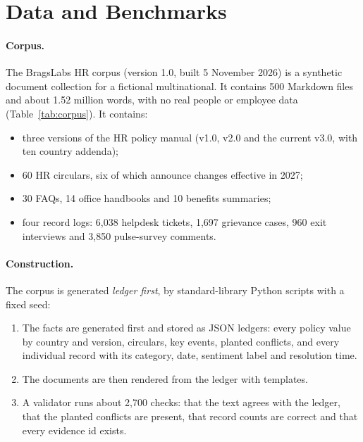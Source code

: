 \documentclass[11pt,letterpaper,oneside]{report}
\begin{document}
\section{Data and Benchmarks}
\label{sec:data}

\paragraph{Corpus.}
The BragsLabs HR corpus (version 1.0, built 5 November 2026) is a synthetic
document collection for a fictional multinational. It contains 500 Markdown
files and about 1.52 million words, with no real people or employee data
(Table~\ref{tab:corpus}). It contains:
\begin{itemize}
  \item three versions of the HR policy manual (v1.0, v2.0 and the current
  v3.0, with ten country addenda);
  \item 60 HR circulars, six of which announce changes effective in 2027;
  \item 30 FAQs, 14 office handbooks and 10 benefits summaries;
  \item four record logs: 6{,}038 helpdesk tickets, 1{,}697 grievance cases,
  960 exit interviews and 3{,}850 pulse-survey comments.
\end{itemize}

\paragraph{Construction.}
The corpus is generated \emph{ledger first}, by standard-library Python
scripts with a fixed seed:
\begin{enumerate}
  \item The facts are generated first and stored as JSON ledgers: every
  policy value by country and version, circulars, key events, planted
  conflicts, and every individual record with its category, date, sentiment
  label and resolution time.
  \item The documents are then rendered from the ledger with templates.
  \item A validator runs about 2{,}700 checks: that the text agrees with the
  ledger, that the planted conflicts are present, that record counts are
  correct and that every evidence id exists.
\end{enumerate}
\end{document}
